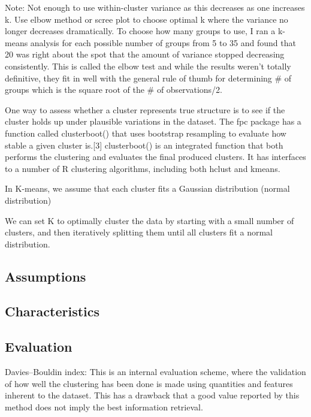 \documentclass[]{book}
\theoremstyle{definition}
\theoremstyle{definition}
\theoremstyle{definition}
\theoremstyle{remark}
\begin{document}
Note: Not enough to use within-cluster variance as this decreases as one
increases k. Use elbow method or scree plot to choose optimal k where
the variance no longer decreases dramatically. To choose how many groups
to use, I ran a k-means analysis for each possible number of groups from
5 to 35 and found that 20 was right about the spot that the amount of
variance stopped decreasing consistently. This is called the elbow test
and while the results weren't totally definitive, they fit in well with
the general rule of thumb for determining \# of groups which is the
square root of the \# of observations/2.

One way to assess whether a cluster represents true structure is to see
if the cluster holds up under plausible variations in the dataset. The
fpc package has a function called clusterboot() that uses bootstrap
resampling to evaluate how stable a given cluster is.{[}3{]}
clusterboot() is an integrated function that both performs the
clustering and evaluates the final produced clusters. It has interfaces
to a number of R clustering algorithms, including both hclust and
kmeans.

In K-means, we assume that each cluster fits a Gaussian distribution
(normal distribution)

We can set K to optimally cluster the data by starting with a small
number of clusters, and then iteratively splitting them until all
clusters fit a normal distribution.

\subsection{Assumptions}\label{assumptions-5}

\subsection{Characteristics}\label{characteristics}

\subsection{Evaluation}\label{evaluation-4}

Davies--Bouldin index: This is an internal evaluation scheme, where the
validation of how well the clustering has been done is made using
quantities and features inherent to the dataset. This has a drawback
that a good value reported by this method does not imply the best
information retrieval.
\end{document}
